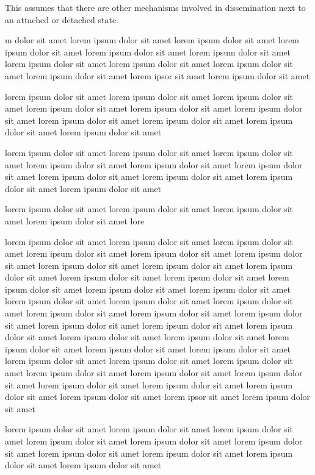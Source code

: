 This assumes that there are other mechanisms involved in dissemination
next to an attached or detached state.

m dolor sit amet lorem ipsum dolor sit amet 
lorem ipsum dolor sit amet lorem ipsum dolor sit amet lorem ipsum dolor sit amet
lorem ipsum dolor sit amet lorem ipsum dolor sit amet 
lorem ipsum dolor sit amet lorem ipsum dolor sit amet lorem ipsum dolor sit amet
lorem ipsor sit amet lorem ipsum dolor sit amet 


lorem ipsum dolor sit amet lorem ipsum dolor sit amet lorem ipsum dolor sit amet
lorem ipsum dolor sit amet lorem ipsum dolor sit amet 
lorem ipsum dolor sit amet lorem ipsum dolor sit amet lorem ipsum dolor sit amet
lorem ipsum dolor sit amet lorem ipsum dolor sit amet 


lorem ipsum dolor sit amet lorem ipsum dolor sit amet lorem ipsum dolor sit amet
lorem ipsum dolor sit amet lorem ipsum dolor sit amet 
lorem ipsum dolor sit amet lorem ipsum dolor sit amet lorem ipsum dolor sit amet
lorem ipsum dolor sit amet lorem ipsum dolor sit amet 


lorem ipsum dolor sit amet lorem ipsum dolor sit amet lorem ipsum dolor sit amet
lorem ipsum dolor sit amet lore

lorem ipsum dolor sit amet lorem ipsum dolor sit amet lorem ipsum dolor sit amet
lorem ipsum dolor sit amet lorem ipsum dolor sit amet 
lorem ipsum dolor sit amet lorem ipsum dolor sit amet lorem ipsum dolor sit amet
lorem ipsum dolor sit amet lorem ipsum dolor sit amet 
lorem ipsum dolor sit amet lorem ipsum dolor sit amet lorem ipsum dolor sit amet
lorem ipsum dolor sit amet lorem ipsum dolor sit amet 
lorem ipsum dolor sit amet lorem ipsum dolor sit amet lorem ipsum dolor sit amet
lorem ipsum dolor sit amet lorem ipsum dolor sit amet 
lorem ipsum dolor sit amet lorem ipsum dolor sit amet lorem ipsum dolor sit amet
lorem ipsum dolor sit amet lorem ipsum dolor sit amet 
lorem ipsum dolor sit amet lorem ipsum dolor sit amet lorem ipsum dolor sit amet
lorem ipsum dolor sit amet lorem ipsum dolor sit amet 
lorem ipsum dolor sit amet lorem ipsum dolor sit amet lorem ipsum dolor sit amet
lorem ipsum dolor sit amet lorem ipsum dolor sit amet 
lorem ipsum dolor sit amet lorem ipsum dolor sit amet lorem ipsum dolor sit amet
lorem ipsor sit amet lorem ipsum dolor sit amet 


lorem ipsum dolor sit amet lorem ipsum dolor sit amet lorem ipsum dolor sit amet
lorem ipsum dolor sit amet lorem ipsum dolor sit amet 
lorem ipsum dolor sit amet lorem ipsum dolor sit amet lorem ipsum dolor sit amet
lorem ipsum dolor sit amet lorem ipsum dolor sit amet 


